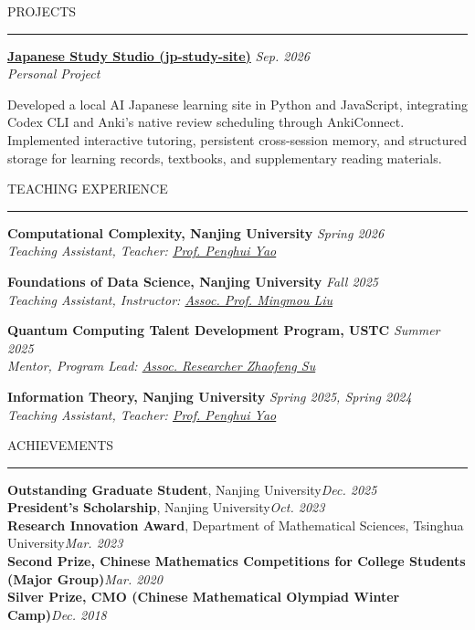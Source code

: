 \documentclass{resume_tsinghua} %
\renewenvironment{rSection}[1]{
\sectionskip
\textcolor{TsinghuaPurple}{\MakeUppercase{#1}}
\sectionlineskip
\hrule
\begin{list}{}{
\setlength{\leftmargin}{0em}
}
\item[]
}{
\end{list}
}
\renewcommand{\sectionlineskip}{\smallskip}
\begin{document}
\newpage

\begin{rSection}{Projects}
{\bf \href{https://github.com/loftea/jp-study-site}{Japanese Study Studio (jp-study-site)}} \hfill {\em Sep. 2026}
\\
\textit{Personal Project}
\par
Developed a local AI Japanese learning site in Python and JavaScript, integrating Codex CLI and Anki's native review scheduling through AnkiConnect. Implemented interactive tutoring, persistent cross-session memory, and structured storage for learning records, textbooks, and supplementary reading materials.

\end{rSection}

\begin{rSection}{Teaching Experience}

{\bf Computational Complexity, Nanjing University} \hfill {\em Spring 2026}
   \\
   \textit{ Teaching Assistant, Teacher: \href{http://penghuiyao.info/}{Prof. Penghui Yao}}

   {\bf Foundations of Data Science, Nanjing University} \hfill {\em Fall 2025}
\\
\textit{Teaching Assistant, Instructor: \href{https://njusz.nju.edu.cn/55/c6/c53016a742854/page.htm}{Assoc. Prof. Mingmou Liu}}

   {\bf Quantum Computing Talent Development Program, USTC} \hfill {\em Summer 2025}
   \\
   \textit{Mentor, Program Lead: \href{https://faculty.ustc.edu.cn/zfsu/zh_CN/kyxm/990249/content/21787.htm}{Assoc. Researcher Zhaofeng Su}}

   {\bf Information Theory, Nanjing University} \hfill {\em Spring 2025, Spring 2024}
   \\
   \textit{ Teaching Assistant, Teacher: \href{http://penghuiyao.info/}{Prof. Penghui Yao}}

\end{rSection}

\begin{rSection}{Achievements} \itemsep -2pt
{\textbf{Outstanding Graduate Student}, Nanjing University}\hfill {\em Dec. 2025} \\
{\textbf{President's Scholarship}, Nanjing University}\hfill {\em Oct. 2023} \\
{\textbf{Research Innovation Award}, Department of Mathematical Sciences, Tsinghua University}\hfill {\em Mar. 2023} \\
{\textbf{Second Prize, Chinese Mathematics Competitions for College Students (Major Group)}}\hfill {\em Mar. 2020} \\
{\textbf{Silver Prize, CMO (Chinese Mathematical Olympiad Winter Camp)}}\hfill {\em Dec. 2018}

\end{rSection}
\end{document}
